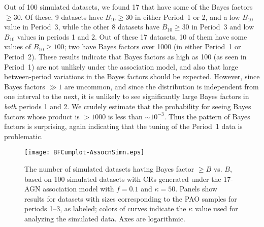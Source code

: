 Out of 100 simulated datasets, we found 17 that have some of the Bayes
factors $\geq 30$.  Of these, 9 datasets have $B_{10}\geq 30$ in either
Period~1 or 2, and a low $B_{10}$ value in Period~3, while the other 8
datasets have $B_{10}\geq 30$ in Period~3 and low $B_{10}$ values in periods
1 and 2.  Out of these 17 datasets, 10 of them have some values of
$B_{10}\geq 100$; two have Bayes factors over 1000 (in either Period~1
or Period~2).  
These results indicate that Bayes factors as high as 100 (as seen in
Period~1) are not unlikely under the association model, and also that
large between-period variations in the Bayes factors should be expected.
 However, since Bayes factors $\gg 1$ are uncommon, and since the
distribution is independent from one interval to the next, it is
unlikely to see significantly large Bayes factors in {\em both} periods
1 and 2. We crudely estimate that the probability for seeing Bayes
factors whose product is $> 1000$ is less than $\sim 10^{-3}$.  Thus the
pattern of Bayes factors is surprising, again indicating that the tuning
of the Period~1 data is problematic.

\begin{figure}
\centerline{\texttt{[image: BFCumplot-AssocnSimn.eps]}}
\caption{The number of simulated datasets having Bayes factor $\geq B$
vs. $B$, based on 100 simulated datasets with CRs generated under the
17-AGN association model with $f=0.1$ and $\kappa=50$.  Panels show
results for datasets with sizes corresponding to the PAO samples for
periods 1--3, as labeled; colors of curves indicate the $\kappa$ value
used for analyzing the simulated data.  Axes are logarithmic.}
\label{fig:assocCumBF}
\end{figure}
